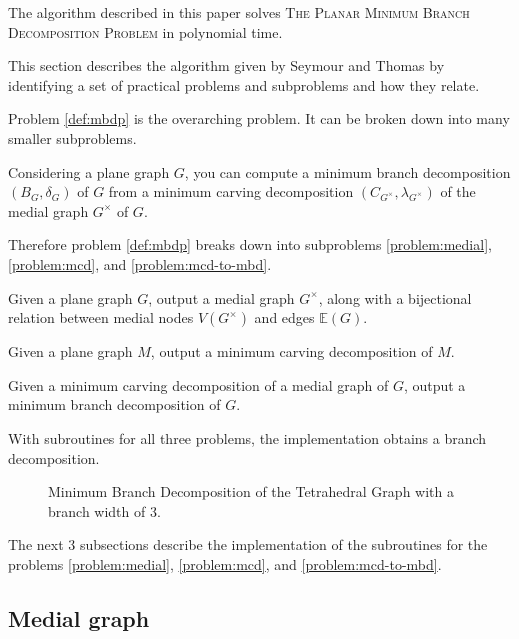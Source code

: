 \documentclass{article}
\begin{document}
	The algorithm described in this paper solves \textsc{The Planar Minimum Branch Decomposition Problem} in polynomial time.

	This section describes the algorithm given by Seymour and Thomas\cite{ST93} by identifying a set of practical problems and subproblems and how they relate.
	
	Problem \ref{def:mbdp} is the overarching problem. It can be broken down into many smaller subproblems.

	Considering a plane graph $G$, you can compute a minimum branch decomposition $(B_G, \delta_G)$ of $G$ from a minimum carving decomposition $(C_{G^\times}, \lambda_{G^\times})$ of the medial graph $G^\times$ of $G$.

	Therefore problem \ref{def:mbdp} breaks down into subproblems \ref{problem:medial}, \ref{problem:mcd}, and \ref{problem:mcd-to-mbd}.

	\begin{problem}\label{problem:medial}
		Given a plane graph $G$, output a medial graph $G^\times$, along with a bijectional relation between medial nodes $V(G^\times)$ and edges $\mathbb{E}(G)$.
	\end{problem}

	\begin{problem}\label{problem:mcd}
		Given a plane graph $M$, output a minimum carving decomposition of $M$.
	\end{problem}

	\begin{problem}\label{problem:mcd-to-mbd}
		Given a minimum carving decomposition of a medial graph of $G$, output a minimum branch decomposition of $G$.
	\end{problem}

	With subroutines for all three problems, the implementation obtains a branch decomposition.


	\begin{figure}[H]
		\centering
		
		\caption{Minimum Branch Decomposition of the Tetrahedral Graph with a branch width of 3.}
		\label{fig:bd}
	\end{figure}

	The next 3 subsections describe the implementation of the subroutines for the problems \ref{problem:medial}, \ref{problem:mcd}, and \ref{problem:mcd-to-mbd}.

	\subsection{Medial graph}
\end{document}
